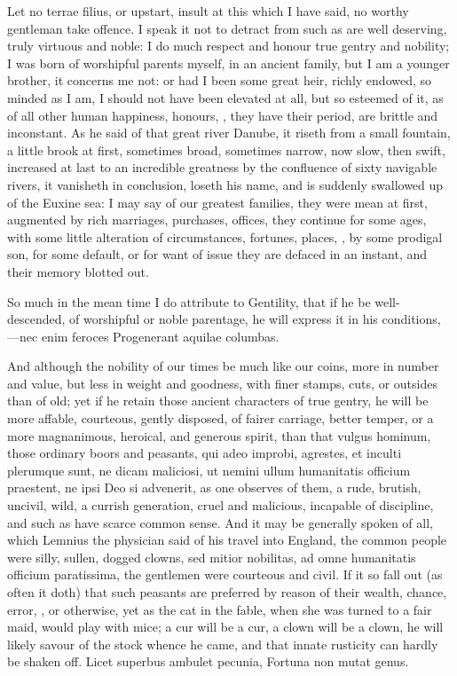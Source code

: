 {Let no terrae filius, or upstart, insult at this which I have said, no
worthy gentleman take offence. I speak it not to detract from such as
are well deserving, truly virtuous and noble: I do much respect and
honour true gentry and nobility; I was born of worshipful parents
myself, in an ancient family, but I am a younger brother, it concerns
me not: or had I been some great heir, richly endowed, so minded as I
am, I should not have been elevated at all, but so esteemed of it, as
of all other human happiness, honours, \etc{}, they have their period, are
brittle and inconstant. As  he said of that great river Danube,
it riseth from a small fountain, a little brook at first, sometimes
broad, sometimes narrow, now slow, then swift, increased at last to an
incredible greatness by the confluence of sixty navigable rivers, it
vanisheth in conclusion, loseth his name, and is suddenly swallowed up
of the Euxine sea: I may say of our greatest families, they were mean
at first, augmented by rich marriages, purchases, offices, they
continue for some ages, with some little alteration of circumstances,
fortunes, places, \etc{}, by some prodigal son, for some default, or for
want of issue they are defaced in an instant, and their memory blotted
out.

So much in the mean time I do attribute to Gentility, that if he be
well-descended, of worshipful or noble parentage, he will express it in
his conditions,
---nec enim feroces
Progenerant aquilae columbas.

And although the nobility of our times be much like our coins, more in
number and value, but less in weight and goodness, with finer stamps,
cuts, or outsides than of old; yet if he retain those ancient
characters of true gentry, he will be more affable, courteous, gently
disposed, of fairer carriage, better temper, or a more magnanimous,
heroical, and generous spirit, than that vulgus hominum, those ordinary
boors and peasants, qui adeo improbi, agrestes, et inculti plerumque
sunt, ne dicam maliciosi, ut nemini ullum humanitatis officium
praestent, ne ipsi Deo si advenerit, as one observes of them, a
rude, brutish, uncivil, wild, a currish generation, cruel and
malicious, incapable of discipline, and such as have scarce common
sense. And it may be generally spoken of all, which  Lemnius the
physician said of his travel into England, the common people were
silly, sullen, dogged clowns, sed mitior nobilitas, ad omne humanitatis
officium paratissima, the gentlemen were courteous and civil. If it so
fall out (as often it doth) that such peasants are preferred by reason
of their wealth, chance, error, \etc{}, or otherwise, yet as the cat in
the fable, when she was turned to a fair maid, would play with mice; a
cur will be a cur, a clown will be a clown, he will likely savour of
the stock whence he came, and that innate rusticity can hardly be
shaken off.
Licet superbus ambulet pecunia,
Fortuna non mutat genus.

}
